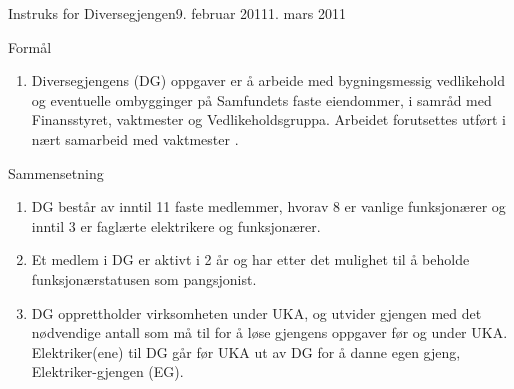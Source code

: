 \documentclass[../fsbok.tex]{subfiles}
\begin{document}

\begin{instruks}{Instruks for Diversegjengen}{9. februar 2011}{1. mars 2011}

    \begin{instruksledd}{Formål}
        \begin{enumerate}
            \item Diversegjengens (DG) oppgaver er å arbeide med bygningsmessig vedlikehold og eventuelle
                ombygginger på Samfundets faste eiendommer, i samråd med Finansstyret, vaktmester og Vedlikeholdsgruppa.
                Arbeidet forutsettes utført i nært samarbeid med vaktmester .
        \end{enumerate}
    \end{instruksledd}

    \begin{instruksledd}{Sammensetning}
        \begin{enumerate}
            \item DG består av inntil 11 faste medlemmer, hvorav 8 er vanlige funksjonærer
                og inntil 3 er faglærte elektrikere og funksjonærer.
            \item Et medlem i DG er aktivt i 2 år og har etter det mulighet til å beholde
                funksjonærstatusen som pangsjonist.
            \item DG opprettholder virksomheten under UKA, og utvider gjengen med det nødvendige antall
                som må til for å løse gjengens oppgaver før og under UKA. Elektriker(ene) til DG går før UKA ut av DG for å
                danne egen gjeng, Elektriker-gjengen (EG).
        \end{enumerate}
    \end{instruksledd}


\end{instruks}
\end{document}
